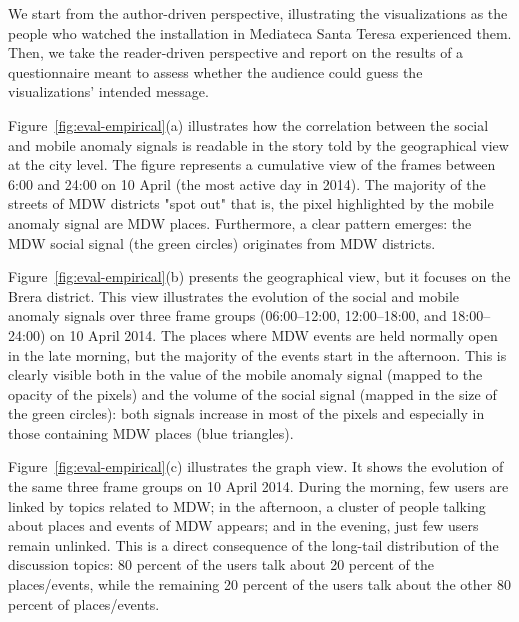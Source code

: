 We start from the author-driven perspective, illustrating the visualizations as the people who watched the installation in Mediateca Santa Teresa experienced them. Then, we take the reader-driven perspective and report on the results of a questionnaire meant to assess whether the audience could guess the visualizations' intended message.

Figure~\ref{fig:eval-empirical}(a) illustrates how the correlation between the social and mobile anomaly signals is readable in the story told by the geographical view at the city level. The figure represents a cumulative view of the frames between 6:00 and 24:00 on 10 April (the most active day in 2014). The majority of the streets of MDW districts "spot out" that is, the pixel highlighted by the mobile anomaly signal are MDW places. Furthermore, a clear pattern emerges: the MDW social signal (the green circles) originates from MDW districts.

Figure~\ref{fig:eval-empirical}(b) presents the geographical view, but it focuses on the Brera district. This view illustrates the evolution of the social and mobile anomaly signals over three frame groups (06:00--12:00, 12:00--18:00, and 18:00--24:00) on 10 April 2014. The places where MDW events are held normally open in the late morning, but the majority of the events start in the afternoon. This is clearly visible both in the value of the mobile anomaly signal (mapped to the opacity of the pixels) and the volume of the social signal (mapped in the size of the green circles): both signals increase in most of the pixels and especially in those containing MDW places (blue triangles).

Figure~\ref{fig:eval-empirical}(c) illustrates the graph view. It shows the evolution of the same three frame groups on 10 April 2014. During the morning, few users are linked by topics related to MDW; in the afternoon, a cluster of people talking about places and events of MDW appears; and in the evening, just few users remain unlinked. This is a direct consequence of the long-tail distribution of the discussion topics: 80 percent of the users talk about 20 percent of the places/events, while the remaining 20 percent of the users talk about the other 80 percent of places/events.

